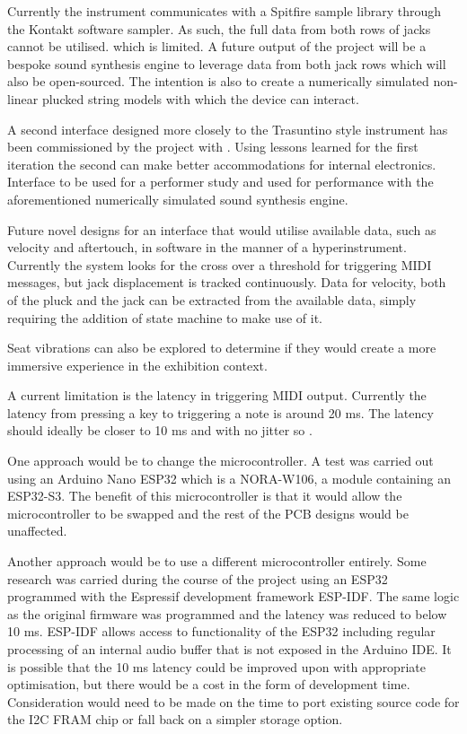 Currently the instrument communicates with a Spitfire sample library through the Kontakt software sampler. As such, the full data from both rows of jacks cannot be utilised. which is limited. A future output of the  project will be a bespoke sound synthesis engine to leverage data from both jack rows
which will also be open-sourced. The intention is also to create a numerically simulated non-linear plucked string models with which the device can interact. 


A second interface designed more closely to the Trasuntino style instrument has been commissioned by the  project with . 
Using lessons learned for the first iteration the second can make better accommodations for internal electronics. Interface to be used for a performer study and used for performance with the aforementioned numerically simulated sound synthesis engine.

Future novel designs for an interface that would utilise available data, such as velocity and aftertouch, in software in the manner of a hyperinstrument.
Currently the system looks for the cross over a threshold for triggering MIDI messages, but jack displacement is tracked continuously. Data for velocity, both of the pluck and the jack can be extracted from the available data, simply requiring the addition of state machine to make use of it.

Seat vibrations \cite{MusicalHaptics2018_07} can also be explored to determine if they would create a more immersive experience in the exhibition context.



A current limitation is the latency in triggering MIDI output. Currently the latency from pressing a key to triggering a note is around 20 ms. 
The latency should ideally be closer to 10 ms and with no jitter so \cite{Jack2016}.

One approach would be to change the microcontroller. A test
was carried out using an Arduino Nano ESP32 which is a NORA-W106, a module containing an ESP32-S3. 
The benefit of this microcontroller is that it would allow the microcontroller to be swapped and the rest of the PCB
designs would be unaffected.

Another approach would be to use a different microcontroller entirely. 
Some research was carried during the course of the project using an ESP32 programmed with the Espressif development framework ESP-IDF. 
The same logic as the original firmware was programmed and the latency was reduced to below 10 ms. ESP-IDF allows access to functionality of the ESP32 including regular processing of an internal audio buffer that is not exposed in the Arduino IDE. 
It is possible that the 10 ms latency could be improved upon with appropriate optimisation, but there would be a cost in the form of development time. 
Consideration would need to be made on the time to port existing source code for the I2C FRAM chip or fall back on a simpler storage option.



